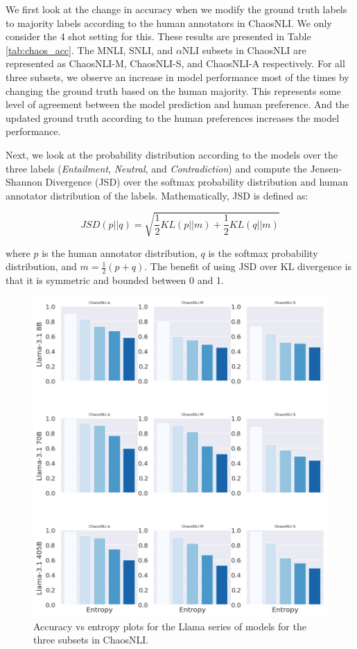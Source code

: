 We first look at the change in accuracy when we modify the ground truth labels to majority labels according to the human annotators in ChaosNLI. We only consider the 4 shot setting for this. These results are presented in Table \ref{tab:chaos_acc}. The MNLI, SNLI, and $\alpha$NLI subsets in ChaosNLI are represented as ChaosNLI-M, ChaosNLI-S, and ChaosNLI-A respectively. For all three subsets, we observe an increase in model performance most of the times by changing the ground truth based on the human majority. This represents some level of agreement between the model prediction and human preference. And the updated ground truth according to the human preferences increases the model performance.


Next, we look at the probability distribution according to the models over the three labels (\textit{Entailment}, \textit{Neutral}, and \textit{Contradiction}) and compute the Jensen-Shannon Divergence (JSD) \citep{menendez1997jensen} over the softmax probability distribution and human annotator distribution of the labels. Mathematically, JSD is defined as:

\[
    JSD(p || q) = \sqrt{\frac{1}{2}KL(p || m) + \frac{1}{2}KL(q || m)}
\]

where $p$ is the human annotator distribution, $q$ is the softmax probability distribution, and $m = \frac{1}{2}(p + q)$. The benefit of using JSD over KL divergence is that it is symmetric and bounded between 0 and 1.

\begin{figure}
    \centering
    \includegraphics[width=0.7\linewidth]{figures/entropy_acc.png}
    \caption{Accuracy vs entropy plots for the Llama series of models for the three subsets in ChaosNLI.}
    \label{fig:entropy_accuracy}
\end{figure}

